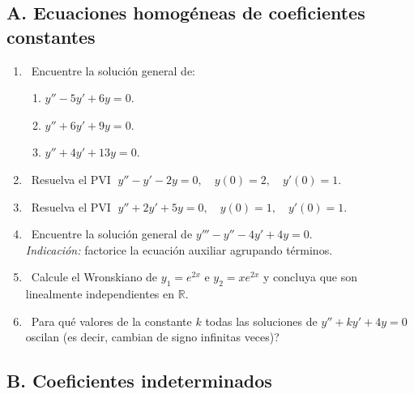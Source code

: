 \subsection*{A. Ecuaciones homog\'eneas de coeficientes constantes}

\begin{enumerate}[label=\textbf{A\arabic*.}, leftmargin=*]
    \item \facil\ Encuentre la soluci\'on general de:
    \begin{enumerate}[label=\alph*)]
        \item $y''-5y'+6y=0$.
        \item $y''+6y'+9y=0$.
        \item $y''+4y'+13y=0$.
    \end{enumerate}
    \item \facil\ Resuelva el PVI $\;y''-y'-2y=0,\quad y(0)=2,\quad y'(0)=1$.
    \item \facil\ Resuelva el PVI $\;y''+2y'+5y=0,\quad y(0)=1,\quad y'(0)=1$.
    \item \medio\ Encuentre la soluci\'on general de $y'''-y''-4y'+4y=0$.\\
    \textit{Indicaci\'on:} factorice la ecuaci\'on auxiliar agrupando t\'erminos.
    \item \medio\ Calcule el Wronskiano de $y_1=e^{2x}$ e $y_2=xe^{2x}$ y concluya que son linealmente independientes en $\mathbb{R}$.
    \item \dificil\ \textquestiondown Para qu\'e valores de la constante $k$ todas las soluciones de $y''+ky'+4y=0$ oscilan (es decir, cambian de signo infinitas veces)?
\end{enumerate}

\subsection*{B. Coeficientes indeterminados}

